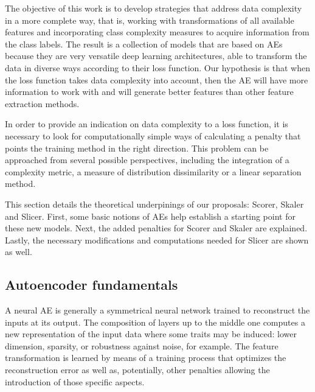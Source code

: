 The objective of this work is to develop strategies that address data complexity in a more complete way, that is, working with transformations of all available features and incorporating class complexity measures to acquire information from the class labels. The result is a collection of models that are based on AEs because they are very versatile deep learning architectures, able to transform the data in diverse ways according to their loss function. Our hypothesis is that when the loss function takes data complexity into account, then the AE will have more information to work with and will generate better features than other feature extraction methods.

In order to provide an indication on data complexity to a loss function, it is necessary to look for computationally simple ways of calculating a penalty that points the training method in the right direction. This problem can be approached from several possible perspectives, including the integration of a complexity metric, a measure of distribution dissimilarity or a linear separation method.

This section details the theoretical underpinings of our proposals: Scorer, Skaler and Slicer. First, some basic notions of AEs help establish a starting point for these new models. Next, the added penalties for Scorer and Skaler are explained. Lastly, the necessary modifications and computations needed for Slicer are shown as well.


\subsection{Autoencoder fundamentals}
\label{p6sec.aefund}

A neural AE  is generally a symmetrical neural network trained to reconstruct the inputs at its output. The composition of layers up to the middle one computes a new representation of the input data where some traits may be induced: lower dimension, sparsity, or robustness against noise, for example. The feature transformation is learned by means of a training process that optimizes the reconstruction error as well as, potentially, other penalties allowing the introduction of those specific aspects.

